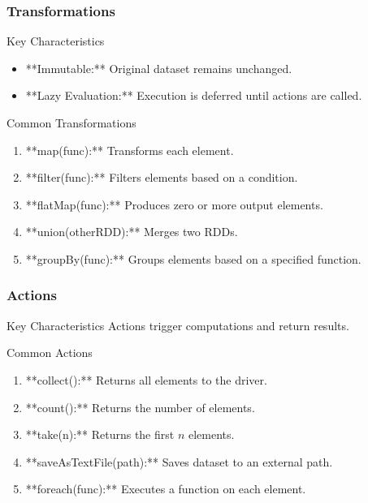 \documentclass[aspectratio=169]{beamer}
\begin{document}
\begin{frame}[fragile]
    \frametitle{Transformations}
    \begin{block}{Key Characteristics}
        \begin{itemize}
            \item **Immutable:** Original dataset remains unchanged.
            \item **Lazy Evaluation:** Execution is deferred until actions are called.
        \end{itemize}
    \end{block}
    
    \begin{block}{Common Transformations}
        \begin{enumerate}
            \item **map(func):** Transforms each element.
            \item **filter(func):** Filters elements based on a condition.
            \item **flatMap(func):** Produces zero or more output elements.
            \item **union(otherRDD):** Merges two RDDs.
            \item **groupBy(func):** Groups elements based on a specified function.
        \end{enumerate}
    \end{block}
\end{frame}

\begin{frame}[fragile]
    \frametitle{Actions}
    \begin{block}{Key Characteristics}
        Actions trigger computations and return results.
    \end{block}
    
    \begin{block}{Common Actions}
        \begin{enumerate}
            \item **collect():** Returns all elements to the driver.
            \item **count():** Returns the number of elements.
            \item **take(n):** Returns the first \( n \) elements.
            \item **saveAsTextFile(path):** Saves dataset to an external path.
            \item **foreach(func):** Executes a function on each element.
        \end{enumerate}
    \end{block}    
\end{frame}
\end{document}
